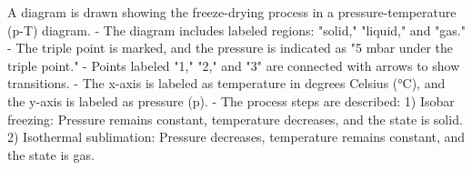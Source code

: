 A diagram is drawn showing the freeze-drying process in a pressure-temperature (p-T) diagram.  
- The diagram includes labeled regions: "solid," "liquid," and "gas."  
- The triple point is marked, and the pressure is indicated as "5 mbar under the triple point."  
- Points labeled "1," "2," and "3" are connected with arrows to show transitions.  
- The x-axis is labeled as temperature in degrees Celsius (°C), and the y-axis is labeled as pressure (p).  
- The process steps are described:  
  1) Isobar freezing: Pressure remains constant, temperature decreases, and the state is solid.  
  2) Isothermal sublimation: Pressure decreases, temperature remains constant, and the state is gas.